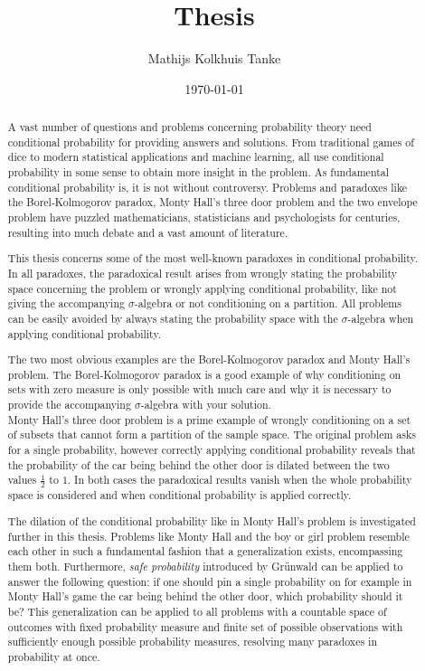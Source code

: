 \documentclass[a4paper]{report}
\title{Thesis}
\author{Mathijs Kolkhuis Tanke}
\date{\today}
\theoremstyle{plain}
\theoremstyle{definition}
\theoremstyle{remark}
\numberwithin{equation}{chapter}
\DeclareMathOperator{\1}{\mathbbm{1}}
\begin{document}
\begin{titlepage}

\end{titlepage}


\begin{abstract}
A vast number of questions and problems concerning probability theory need conditional probability for providing answers and solutions. From traditional games of dice to modern statistical applications and machine learning, all use conditional probability in some sense to obtain more insight in the problem. As fundamental conditional probability is, it is not without controversy. Problems and paradoxes like the Borel-Kolmogorov paradox, Monty Hall's three door problem and the two envelope problem have puzzled mathematicians, statisticians and psychologists for centuries, resulting into much debate and a vast amount of literature.

This thesis concerns some of the most well-known paradoxes in conditional probability. In all paradoxes, the paradoxical result arises from wrongly stating the probability space concerning the problem or wrongly applying conditional probability, like not giving the accompanying $\sigma$-algebra or not conditioning on a partition. All problems can be easily avoided by always stating the probability space with the $\sigma$-algebra when applying conditional probability.

The two most obvious examples are the Borel-Kolmogorov paradox and Monty Hall's problem. The Borel-Kolmogorov paradox is a good example of why conditioning on sets with zero measure is only possible with much care and why it is necessary to provide the accompanying $\sigma$-algebra with your solution.\\
Monty Hall's three door problem is a prime example of wrongly conditioning on a set of subsets that cannot form a partition of the sample space. The original problem asks for a single probability, however correctly applying conditional probability reveals that the probability of the car being behind the other door is dilated between the two values $\frac{1}{2}$ to $1$. In both cases the paradoxical results vanish when the whole probability space is considered and when conditional probability is applied correctly.

The dilation of the conditional probability like in Monty Hall's problem is investigated further in this thesis. Problems like Monty Hall and the boy or girl problem resemble each other in such a fundamental fashion that a generalization exists, encompassing them both. Furthermore, \emph{safe probability} introduced by Grünwald \cite{Grunwald18} can be applied to answer the following question: if one should pin a single probability on for example in Monty Hall's game the car being behind the other door, which probability should it be? This generalization can be applied to all problems with a countable space of outcomes with fixed probability measure and finite set of possible observations with sufficiently enough possible probability measures, resolving many paradoxes in probability at once.
\end{abstract}
\end{document}
